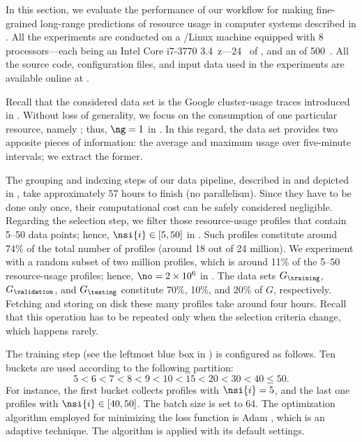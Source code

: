 In this section, we evaluate the performance of our workflow for making
fine-grained long-range predictions of resource usage in computer systems
described in . All the experiments are conducted on a
/Linux machine equipped with 8 processors---each being an Intel Core
i7-3770 3.4~z---24~ of , and an  of 500~.
All the source code, configuration files, and input data used in the experiments
are available online at \cite{eslab2017b}.


Recall that the considered data set is the Google cluster-usage traces
\cite{reiss2011} introduced in . Without loss of
generality, we focus on the consumption of one particular resource, namely
; thus, $\ng = 1$ in . In this regard, the data set
provides two apposite pieces of information: the average and maximum 
usage over five-minute intervals; we extract the former.

The grouping and indexing steps of our data pipeline, described in
 and depicted in , take
approximately 57 hours to finish (no parallelism). Since they have to be done
only once, their computational cost can be safely considered negligible.
Regarding the selection step, we filter those resource-usage profiles that
contain 5--50 data points; hence, $\nsi{i} \in [5, 50]$ in .
Such profiles constitute around 74\% of the total number of profiles (around 18
out of 24 million). We experiment with a random subset of two million profiles,
which is around 11\% of the 5--50 resource-usage profiles; hence, $\no = 2
\times 10^6$ in . The data sets $G_\training$,
$G_\validation$, and $G_\testing$ constitute 70\%, 10\%, and 20\% of $G$,
respectively. Fetching and storing on disk these many profiles take around four
hours. Recall that this operation has to be repeated only when the selection
criteria change, which happens rarely.


The training step (see the leftmost blue box in ) is
configured as follows. Ten buckets are used according to the following
partition:
\[
  5 < 6 < 7 < 8 < 9 < 10 < 15 < 20 < 30 < 40 \leq 50.
\]
For instance, the first bucket collects profiles with $\nsi{i} = 5$, and the
last one profiles with $\nsi{i} \in [40, 50]$. The batch size \nb is set to 64.
The optimization algorithm employed for minimizing the loss function is Adam
\cite{kingma2014}, which is an adaptive technique. The algorithm is applied with
its default settings.

